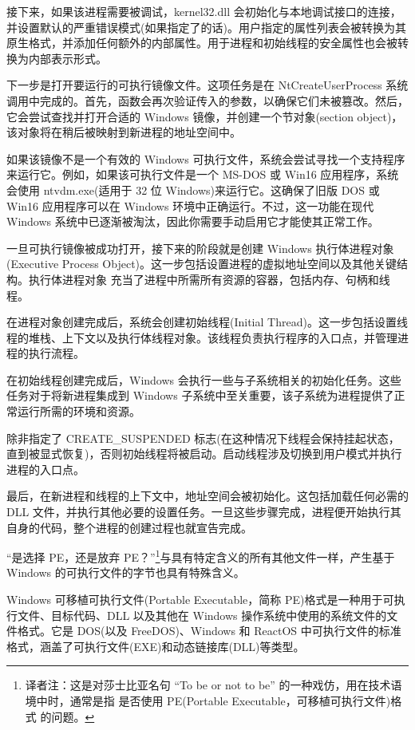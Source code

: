 接下来，如果该进程需要被调试，kernel32.dll 会初始化与本地调试接口的连接，并设置默认的严重错误模式(如果指定了的话)。用户指定的属性列表会被转换为其原生格式，并添加任何额外的内部属性。用于进程和初始线程的安全属性也会被转换为内部表示形式。

下一步是打开要运行的可执行镜像文件。这项任务是在 NtCreateUserProcess 系统调用中完成的。首先，函数会再次验证传入的参数，以确保它们未被篡改。然后，它会尝试查找并打开合适的 Windows 镜像，并创建一个节对象(section object)，该对象将在稍后被映射到新进程的地址空间中。

如果该镜像不是一个有效的 Windows 可执行文件，系统会尝试寻找一个支持程序来运行它。例如，如果该可执行文件是一个 MS-DOS 或 Win16 应用程序，系统会使用 ntvdm.exe(适用于 32 位 Windows)来运行它。这确保了旧版 DOS 或 Win16 应用程序可以在 Windows 环境中正确运行。不过，这一功能在现代 Windows 系统中已逐渐被淘汰，因此你需要手动启用它才能使其正常工作。

一旦可执行镜像被成功打开，接下来的阶段就是创建 Windows 执行体进程对象(Executive Process Object)。这一步包括设置进程的虚拟地址空间以及其他关键结构。执行体进程对象 充当了进程中所需所有资源的容器，包括内存、句柄和线程。

在进程对象创建完成后，系统会创建初始线程(Initial Thread)。这一步包括设置线程的堆栈、上下文以及执行体线程对象。该线程负责执行程序的入口点，并管理进程的执行流程。

在初始线程创建完成后，Windows 会执行一些与子系统相关的初始化任务。这些任务对于将新进程集成到 Windows 子系统中至关重要，该子系统为进程提供了正常运行所需的环境和资源。

除非指定了 CREATE\_SUSPENDED 标志(在这种情况下线程会保持挂起状态，直到被显式恢复)，否则初始线程将被启动。启动线程涉及切换到用户模式并执行进程的入口点。

最后，在新进程和线程的上下文中，地址空间会被初始化。这包括加载任何必需的 DLL 文件，并执行其他必要的设置任务。一旦这些步骤完成，进程便开始执行其自身的代码，整个进程的创建过程也就宣告完成。


“是选择 PE，还是放弃 PE？”\footnote{译者注：这是对莎士比亚名句 “To be or not to be” 的一种戏仿，用在技术语境中时，通常是指 是否使用 PE(Portable Executable，可移植可执行文件)格式 的问题。}与具有特定含义的所有其他文件一样，产生基于 Windows 的可执行文件的字节也具有特殊含义。

Windows 可移植可执行文件(Portable Executable，简称 PE)格式是一种用于可执行文件、目标代码、DLL 以及其他在 Windows 操作系统中使用的系统文件的文件格式。它是 DOS(以及 FreeDOS)、Windows 和 ReactOS 中可执行文件的标准格式，涵盖了可执行文件(EXE)和动态链接库(DLL)等类型。

